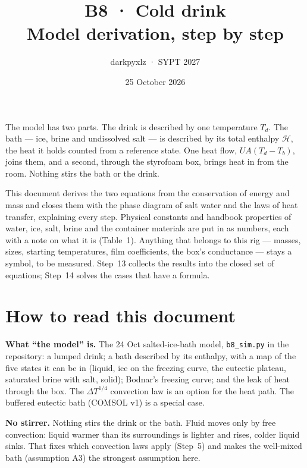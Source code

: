 \documentclass[11pt,a4paper]{article}
\title{\textbf{B8 · Cold drink}\\[2pt]\large Model derivation, step by step}
\author{darkpyxlz · SYPT 2027}
\date{25 October 2026}
\newcommand{\Hb}{\mathcal{H}}
\newcommand{\step}[1]{\section*{#1}\addcontentsline{toc}{section}{#1}}
\begin{document}
\maketitle
\vspace{-1em}

\begin{center}
\begin{minipage}{0.9\linewidth}\small
The model has two parts. The drink is described by one temperature $T_d$. The bath --- ice, brine and
undissolved salt --- is described by its total enthalpy $\Hb$, the heat it holds counted from a
reference state. One heat flow, $UA(T_d - T_b)$, joins them, and a second, through the styrofoam box,
brings heat in from the room. Nothing stirs the bath or the drink.

This document derives the two equations from the conservation of energy and mass and closes them with
the phase diagram of salt water and the laws of heat transfer, explaining every step. Physical
constants and handbook properties of water, ice, salt, brine and the container materials are put in as
numbers, each with a note on what it is (Table~1). Anything that belongs to this rig --- masses, sizes,
starting temperatures, film coefficients, the box's conductance --- stays a symbol, to be measured.
Step~13 collects the results into the closed set of equations; Step~14 solves the cases that have a
formula.
\end{minipage}
\end{center}

\tableofcontents

\step{How to read this document}

\textbf{What ``the model'' is.} The 24 Oct salted-ice-bath model, \texttt{b8\_sim.py} in the
repository: a lumped drink; a bath described by its enthalpy, with a map of the five states it can be in
(liquid, ice on the freezing curve, the eutectic plateau, saturated brine with salt, solid); Bodnar's
freezing curve; and the leak of heat through the box. The $\Delta T^{1/4}$ convection law is an option
for the heat path. The buffered eutectic bath (COMSOL v1) is a special case.

\textbf{No stirrer.} Nothing stirs the drink or the bath. Fluid moves only by free convection: liquid
warmer than its surroundings is lighter and rises, colder liquid sinks. That fixes which convection laws
apply (Step~5) and makes the well-mixed bath (assumption A3) the strongest assumption here.
\end{document}
